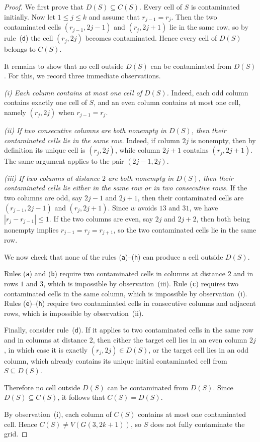 \documentclass[10pt,a4paper]{amsart}
\begin{document}
\begin{proof}
We first prove that \(D(S)\subseteq C(S)\). Every cell of \(S\) is contaminated
initially. Now let \(1\le j\le k\) and assume that \(r_{j-1}=r_j\). Then the
two contaminated cells $(r_{j-1},2j-1)$ and $(r_j,2j+1)$ lie in the same row, so by rule~\textup{(\texttt{d})} the cell \((r_j,2j)\) becomes
contaminated. Hence every cell of \(D(S)\) belongs to \(C(S)\).

It remains to show that no cell outside \(D(S)\) can be contaminated from
\(D(S)\). For this, we record three immediate observations.

 
\noindent\textit{(i) Each column contains at most one cell of \(D(S)\).}
Indeed, each odd column contains exactly one cell of \(S\), and an even column
contains at most one cell, namely \((r_j,2j)\) when \(r_{j-1}=r_j\).

 
\noindent\textit{(ii) If two consecutive columns are both nonempty in \(D(S)\),
then their contaminated cells lie in the same row.}
Indeed, if column \(2j\) is nonempty, then by definition its unique cell is
\((r_j,2j)\), while column \(2j+1\) contains \((r_j,2j+1)\). The same argument
applies to the pair \((2j-1,2j)\).

 
\noindent\textit{(iii) If two columns at distance \(2\) are both nonempty in
\(D(S)\), then their contaminated cells lie either in the same row or in two
consecutive rows.}
If the two columns are odd, say \(2j-1\) and \(2j+1\), then their contaminated
cells are \((r_{j-1},2j-1)\) and \((r_j,2j+1)\). Since \(w\) avoids \(13\) and
\(31\), we have \(|r_j-r_{j-1}|\le 1\). If the two columns are even, say
\(2j\) and \(2j+2\), then both being nonempty implies $r_{j-1}=r_j=r_{j+1}$,  so the two contaminated cells lie in the same row.

 
We now check that none of the rules \textup{(\texttt{a})}--\textup{(\texttt{h})} can produce a
cell outside \(D(S)\).

Rules \textup{(\texttt{a})} and \textup{(\texttt{b})} require two contaminated cells in columns
at distance \(2\) and in rows \(1\) and \(3\), which is impossible by
observation~(iii). Rule \textup{(\texttt{c})} requires two contaminated cells in the
same column, which is impossible by observation~(i). Rules
\textup{(\texttt{e})}--\textup{(\texttt{h})} require two contaminated cells in consecutive
columns and adjacent rows, which is impossible by observation~(ii).

Finally, consider rule~\textup{(\texttt{d})}. If it applies to two contaminated cells in
the same row and in columns at distance \(2\), then either the target cell lies
in an even column \(2j\), in which case it is exactly \((r_j,2j)\in D(S)\), or
the target cell lies in an odd column, which already contains its unique
initial contaminated cell from \(S\subseteq D(S)\).

Therefore no cell outside \(D(S)\) can be contaminated from \(D(S)\). Since
\(D(S)\subseteq C(S)\), it follows that \(C(S)=D(S)\).

By observation~(i), each column of \(C(S)\) contains at most one contaminated
cell. Hence \(C(S)\neq V(G(3,2k+1))\), so \(S\) does not fully contaminate the
grid.\qedhere
\end{proof}
\end{document}
